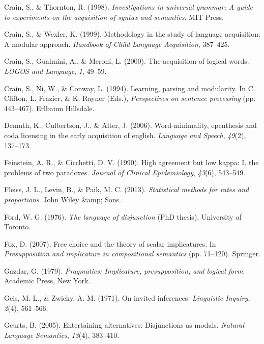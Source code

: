 \documentclass[oneside]{report}
\theoremstyle{definition}
\theoremstyle{definition}
\theoremstyle{definition}
\theoremstyle{remark}
\begin{document}
\hypertarget{ref-crain1998investigations}{}
Crain, S., \& Thornton, R. (1998). \emph{Investigations in universal
grammar: A guide to experiments on the acquisition of syntax and
semantics}. MIT Press.

\hypertarget{ref-crain1999methodology}{}
Crain, S., \& Wexler, K. (1999). Methodology in the study of language
acquisition: A modular approach. \emph{Handbook of Child Language
Acquisition}, 387--425.

\hypertarget{ref-crain2000acquisition}{}
Crain, S., Gualmini, A., \& Meroni, L. (2000). The acquisition of
logical words. \emph{LOGOS and Language}, \emph{1}, 49--59.

\hypertarget{ref-crain1994learning}{}
Crain, S., Ni, W., \& Conway, L. (1994). Learning, parsing and
modularity. In C. Clifton, L. Frazier, \& K. Rayner (Eds.),
\emph{Perspectives on sentence processing} (pp. 443--467). Erlbaum
Hillsdale.

\hypertarget{ref-demuth2006word}{}
Demuth, K., Culbertson, J., \& Alter, J. (2006). Word-minimality,
epenthesis and coda licensing in the early acquisition of english.
\emph{Language and Speech}, \emph{49}(2), 137--173.

\hypertarget{ref-feinstein1990high}{}
Feinstein, A. R., \& Cicchetti, D. V. (1990). High agreement but low
kappa: I. the problems of two paradoxes. \emph{Journal of Clinical
Epidemiology}, \emph{43}(6), 543--549.

\hypertarget{ref-fleiss2013statistical}{}
Fleiss, J. L., Levin, B., \& Paik, M. C. (2013). \emph{Statistical
methods for rates and proportions}. John Wiley \&amp; Sons.

\hypertarget{ref-ford1976language}{}
Ford, W. G. (1976). \emph{The language of disjunction} (PhD thesis).
University of Toronto.

\hypertarget{ref-fox2007free}{}
Fox, D. (2007). Free choice and the theory of scalar implicatures. In
\emph{Presupposition and implicature in compositional semantics} (pp.
71--120). Springer.

\hypertarget{ref-gazdar79}{}
Gazdar, G. (1979). \emph{Pragmatics: Implicature, presupposition, and
logical form}. Academic Press, New York.

\hypertarget{ref-geis1971invited}{}
Geis, M. L., \& Zwicky, A. M. (1971). On invited inferences.
\emph{Linguistic Inquiry}, \emph{2}(4), 561--566.

\hypertarget{ref-geurts2005entertaining}{}
Geurts, B. (2005). Entertaining alternatives: Disjunctions as modals.
\emph{Natural Language Semantics}, \emph{13}(4), 383--410.
\end{document}
